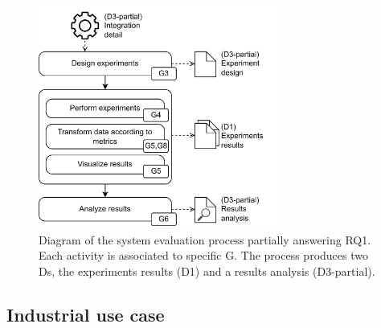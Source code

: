 \begin{figure}[!ht]
    \begin{center}
    \includegraphics[width=0.7\textwidth]{figures/3-method/method_exp.png}
    \caption[System evaluation process - Hudi vs. Iceberg]{Diagram of the system evaluation process partially answering \gls{RQ}1. Each activity is associated to specific \gls{G}. The process produces two \glspl{D}, the experiments results (\gls{D}1) and a results analysis (\gls{D}3-partial).}
    \label{fig:method_experiments}
    \end{center}
\end{figure}


\subsection{Industrial use case}
\label{subsec:method_use_case}

